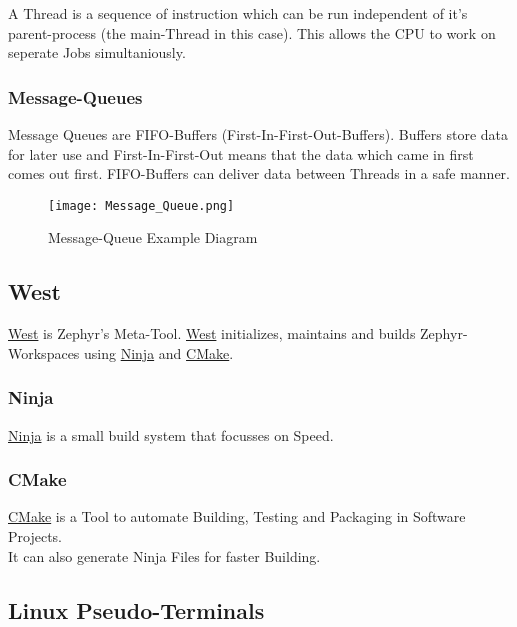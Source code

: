 A Thread is a sequence of instruction which can be run
independent of it's parent-process (the main-Thread in this case).
This allows the CPU to work on seperate Jobs simultaniously.

\subsubsection{Message-Queues}

Message Queues are FIFO-Buffers (First-In-First-Out-Buffers).
Buffers store data for later use and First-In-First-Out means
that the data which came in first comes out first.
FIFO-Buffers can deliver data between Threads in a safe manner.

\begin{figure}[!ht]
	\begin{center}
		\texttt{[image: Message\_Queue.png]}
		\caption{Message-Queue Example Diagram}
	\end{center}
\end{figure}

\pagebreak

\subsection{West}

\href{https://docs.zephyrproject.org/2.4.0/guides/west/index.html}
{West} is Zephyr's Meta-Tool.
\href{https://docs.zephyrproject.org/2.4.0/guides/west/index.html}
{West} initializes, maintains and builds Zephyr-Workspaces
using
\href{https://ninja-build.org/manual.html}
{Ninja} and
\href{https://cmake.org/}
{CMake}.

\subsubsection{Ninja}

\href{https://ninja-build.org/manual.html}
{Ninja} is a small build system that focusses on Speed.

\subsubsection{CMake}

\href{https://cmake.org/}
{CMake} is a Tool to automate Building, Testing and Packaging
in Software Projects.\\
It can also generate Ninja Files for faster Building.

\subsection{Linux Pseudo-Terminals}

